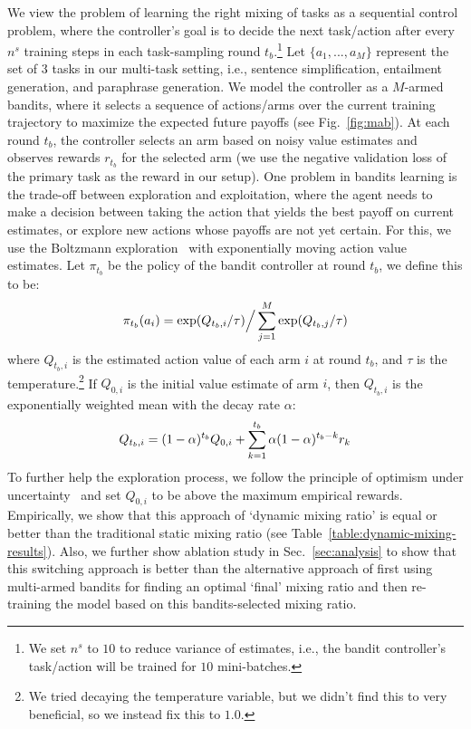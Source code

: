 \documentclass[11pt]{article}
\begin{document}
We view the problem of learning the right mixing of tasks as a sequential control problem, where the controller's goal is to decide the next task/action after every $n^{s}$ training steps in each task-sampling round $t_b$.\footnote{We set $n^{s}$ to $10$ to reduce variance of estimates, i.e., the bandit controller's task/action will be trained for $10$ mini-batches.} Let $\{a_1, ..., a_M\}$ represent the set of 3 tasks in our multi-task setting, i.e., sentence simplification, entailment generation, and paraphrase generation. We model the controller as a $M$-armed bandits, where it selects a sequence of actions/arms over the current training trajectory to maximize the expected future payoffs (see Fig.~\ref{fig:mab}). At each round $t_b$, the controller selects an arm based on noisy value estimates and observes rewards $r_{t_b}$ for the selected arm (we use the  negative validation loss of the primary task as the reward in our setup). One problem in bandits learning is the trade-off between exploration and exploitation, where the agent needs to make a decision between taking the action that yields the best payoff on current estimates, or explore new actions whose payoffs are not yet certain. For this, we use the Boltzmann exploration~\cite{kaelbling1996reinforcement} with exponentially moving action value estimates. Let $\pi_{t_b}$ be the policy of the bandit controller at round $t_b$, we define this to be:
\vspace{-9pt}
\begin{equation}
\pi_{t_b}(a_{i})  = \exp(Q_{t_b,i} / \tau) \Big/ \sum_{j=1}^M\exp(Q_{t_b,j} / \tau)
\vspace{-7pt}
\end{equation}
where $Q_{t_b,i}$ is the estimated action value of each arm $i$ at round $t_b$, and $\tau$ is the temperature.\footnote{We tried decaying the temperature variable, but we didn't find this to very beneficial, so we instead fix this to $1.0$.} If $Q_{0,i}$ is the initial value estimate of arm $i$, then $Q_{t_b,i}$ is the exponentially weighted mean with the decay rate $\alpha$:
\vspace{-9pt}
\begin{equation}
Q_{t_b,i} = (1-\alpha)^{t_b} Q_{0,i} + \sum_{k=1}^{t_b}\alpha(1-\alpha)^{t_b-k}r_k
\vspace{-9pt}
\end{equation}
To further help the exploration process, we follow the principle of optimism under uncertainty~\cite{sutton1998reinforcement} and set $Q_{0,i}$ to be above the maximum empirical rewards. Empirically, we show that this approach of `dynamic mixing ratio' is equal or better than the traditional static mixing ratio (see Table~\ref{table:dynamic-mixing-results}).
Also, we further show ablation study in Sec.~\ref{sec:analysis} to show that this switching approach is better than the alternative approach of first using multi-armed bandits for finding an optimal `final' mixing ratio and then re-training the model based on this bandits-selected mixing ratio.
\end{document}
